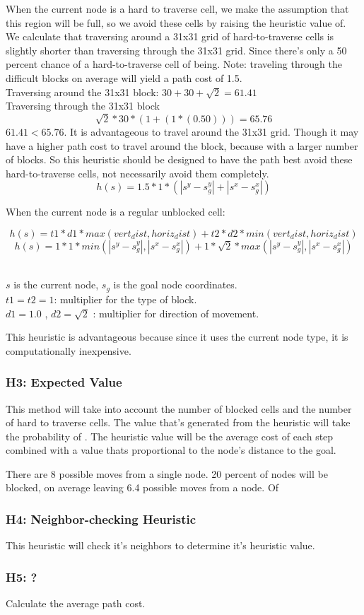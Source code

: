 When the current node is a hard to traverse cell, we make the assumption that this region will be full, so we avoid these cells by raising the heuristic value of.
We calculate that traversing around a 31x31 grid of hard-to-traverse cells is slightly shorter than traversing through the 31x31 grid. Since there's only a 50 percent chance of a hard-to-traverse cell of being. Note: traveling through the difficult blocks on average will yield a path cost of 1.5.
\\Traversing around the 31x31 block: $ 30 + 30 + \sqrt{2} = 61.41$
\\Traversing through the 31x31 block \[ \sqrt{2} * 30 * (1 + (1 * (0.50))) = 65.76\] 
$61.41 < 65.76$. It is advantageous to travel around the 31x31 grid.
Though it may have a higher path cost to travel around the block, because with a larger number of blocks.
So this heuristic should be designed to have the path best avoid these hard-to-traverse cells, not necessarily avoid them completely.
\[h(s) = 1.5 * 1 * ( |s^y - s_g^y| + |s^x - s_g^x| )\]

When the current node is a regular unblocked cell:

\[h(s) = t1 * d1  * max(vert_dist, horiz_dist) + t2 * d2 * min(vert_dist, horiz_dist)\]
\[h(s) = 1 * 1 *min(|s^y - s_g^y|, |s^x - s_g^x|) + 1 * \sqrt{2} * max(|s^y - s_g^y|, |s^x - s_g^x|)   \]

\\ $s$ is the current node, $s_g$ is the goal node coordinates.
\\ $t1 = t2 = 1$: multiplier for the type of block.
\\ $d1 = 1.0$ , $d2 = \sqrt{2}$ : multiplier for direction of movement.

This heuristic is advantageous because since it uses the current node type, it is computationally inexpensive. 

\subsubsection{H3: Expected Value}
This method will take into account the number of blocked cells and the number of hard to traverse cells. The value that's generated from the heuristic will take the probability of . The heuristic value will be the average cost of each step combined with a value thats proportional to the node's distance to the goal.

There are 8 possible moves from a single node. 20 percent of nodes will be blocked, on average leaving 6.4 possible moves from a node. Of

\subsubsection{H4: Neighbor-checking Heuristic}
This heuristic will check it's neighbors to determine it's heuristic value.

\subsubsection{H5: ?}


Calculate the average path cost.